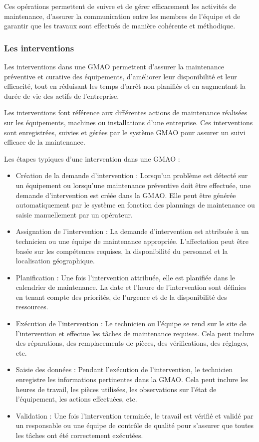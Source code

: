 Ces opérations permettent de suivre et de gérer efficacement les activités de maintenance, d'assurer 
la communication entre les membres de l'équipe et de garantir que les travaux sont 
effectués de manière cohérente et méthodique.
\subsubsection{Les interventions}
Les interventions dans une GMAO permettent d'assurer la maintenance préventive et 
curative des équipements, d'améliorer leur disponibilité et leur efficacité, tout en 
réduisant les temps d'arrêt non planifiés et en augmentant la durée de vie des actifs 
de l'entreprise.

Les interventions font référence aux différentes actions de maintenance réalisées sur 
les équipements, machines ou installations d'une entreprise. Ces interventions sont 
enregistrées, suivies et gérées par le système GMAO pour assurer un suivi efficace de 
la maintenance.

Les étapes typiques d'une intervention dans une GMAO :
\begin{itemize}
    \item Création de la demande d'intervention : Lorsqu'un problème est détecté sur un équipement ou lorsqu'une maintenance préventive doit être effectuée, une demande d'intervention est créée dans la GMAO. Elle peut être générée automatiquement par le système en fonction des plannings de maintenance ou saisie manuellement par un opérateur.
    \item Assignation de l'intervention : La demande d'intervention est attribuée à un technicien ou une équipe de maintenance appropriée. L'affectation peut être basée sur les compétences requises, la disponibilité du personnel et la localisation géographique.
    \item Planification : Une fois l'intervention attribuée, elle est planifiée dans le calendrier de maintenance. La date et l'heure de l'intervention sont définies en tenant compte des priorités, de l'urgence et de la disponibilité des ressources.
    \item Exécution de l'intervention : Le technicien ou l'équipe se rend sur le site de l'intervention et effectue les tâches de maintenance requises. Cela peut inclure des réparations, des remplacements de pièces, des vérifications, des réglages, etc.
    \item Saisie des données : Pendant l'exécution de l'intervention, le technicien enregistre les informations pertinentes dans la GMAO. Cela peut inclure les heures de travail, les pièces utilisées, les observations sur l'état de l'équipement, les actions effectuées, etc.
    \item Validation : Une fois l'intervention terminée, le travail est vérifié et validé par un responsable ou une équipe de contrôle de qualité pour s'assurer que toutes les tâches ont été correctement exécutées.
\end{itemize}
\pagebreak
